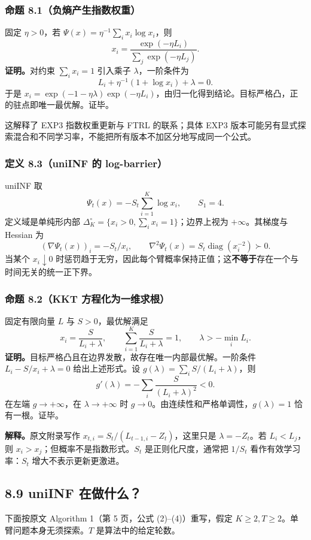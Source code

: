 \subsubsection{命题 8.1（负熵产生指数权重）}
固定 $\eta>0$，若 $\Psi(x)=\eta^{-1}\sum_i x_i\log x_i$，则
\[
x_i=\frac{\exp(-\eta L_i)}{\sum_j\exp(-\eta L_j)}.
\]
\textbf{证明。}对约束 $\sum_i x_i=1$ 引入乘子 $\lambda$，一阶条件为
\[
L_i+\eta^{-1}(1+\log x_i)+\lambda=0.
\]
于是 $x_i=\exp(-1-\eta\lambda)\exp(-\eta L_i)$，由归一化得到结论。目标严格凸，正的驻点即唯一最优解。证毕。

这解释了 EXP3 指数权重更新与 FTRL 的联系；具体 EXP3 版本可能另有显式探索混合和不同学习率，不能把所有版本不加区分地写成同一个公式。

\subsubsection{定义 8.3（uniINF 的 log-barrier）}
uniINF 取
\[
\Psi_t(x)=-S_t\sum_{i=1}^K\log x_i,\qquad S_1=4.
\]
定义域是单纯形内部 $\Delta_K^\circ=\{x_i>0,\sum_i x_i=1\}$；边界上视为 $+\infty$。其梯度与 Hessian 为
\[
(\nabla\Psi_t(x))_i=-S_t/x_i,\qquad
\nabla^2\Psi_t(x)=S_t\operatorname{diag}(x_i^{-2})\succ0.
\]
当某个 $x_i\downarrow0$ 时惩罚趋于无穷，因此每个臂概率保持正值；这\textbf{不等于}存在一个与时间无关的统一正下界。

\subsubsection{命题 8.2（KKT 方程化为一维求根）}
固定有限向量 $L$ 与 $S>0$，最优解满足
\[
x_i=\frac{S}{L_i+\lambda},\qquad
\sum_{i=1}^K\frac{S}{L_i+\lambda}=1,\qquad \lambda>-\min_i L_i.
\]
\textbf{证明。}目标严格凸且在边界发散，故存在唯一内部最优解。一阶条件 $L_i-S/x_i+\lambda=0$ 给出上述形式。设 $g(\lambda)=\sum_iS/(L_i+\lambda)$，则
\[
g'(\lambda)=-\sum_i\frac{S}{(L_i+\lambda)^2}<0.
\]
在左端 $g\to+\infty$，在 $\lambda\to+\infty$ 时 $g\to0$。由连续性和严格单调性，$g(\lambda)=1$ 恰有一根。证毕。

\textbf{解释。}原文附录写作 $x_{t,i}=S_t/(L_{t-1,i}-Z_t)$，这里只是 $\lambda=-Z_t$。若 $L_i<L_j$，则 $x_i>x_j$；但概率不是指数形式。$S_t$ 是正则化尺度，通常把 $1/S_t$ 看作有效学习率：$S_t$ 增大不表示更新更激进。

\subsection{8.9 uniINF 在做什么？}

下面按原文 Algorithm 1（第 5 页，公式 (2)--(4)）重写，假定 $K\ge2,T\ge2$。单臂问题本身无须探索。$T$ 是算法中的给定轮数。

